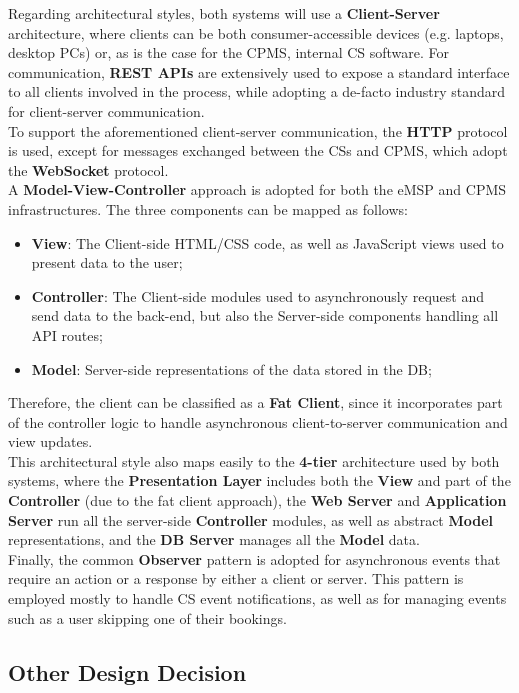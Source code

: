 \documentclass[11pt]{article}
\begin{document}
Regarding architectural styles, both systems will use a \textbf{Client-Server} architecture, where clients can be both consumer-accessible devices (e.g. laptops, desktop PCs) or, as is the case for the CPMS, internal CS software. For communication, \textbf{REST APIs} are extensively used to expose a standard interface to all clients involved in the process, while adopting a de-facto industry standard for client-server communication. \\
To support the aforementioned client-server communication, the \textbf{HTTP} protocol is used, except for messages exchanged between the CSs and CPMS, which adopt the \textbf{WebSocket} protocol. \\
A \textbf{Model-View-Controller} approach is adopted for both the eMSP and CPMS infrastructures. The three components can be mapped as follows:
\begin{itemize}
    \item \textbf{View}: The Client-side HTML/CSS code, as well as JavaScript views used to present data to the user;
    \item \textbf{Controller}: The Client-side modules used to asynchronously request and send data to the back-end, but also the Server-side components handling all API routes;
    \item \textbf{Model}: Server-side representations of the data stored in the DB;
\end{itemize}
Therefore, the client can be classified as a \textbf{Fat Client}, since it incorporates part of the controller logic to handle asynchronous client-to-server communication and view updates. \\
This architectural style also maps easily to the \textbf{4-tier} architecture used by both systems, where the \textbf{Presentation Layer} includes both the \textbf{View} and part of the \textbf{Controller} (due to the fat client approach), the \textbf{Web Server} and \textbf{Application Server} run all the server-side \textbf{Controller} modules, as well as abstract \textbf{Model} representations, and the \textbf{DB Server} manages all the \textbf{Model} data. \\
Finally, the common \textbf{Observer} pattern is adopted for asynchronous events that require an action or a response by either a client or server. This pattern is employed mostly to handle CS event notifications, as well as for managing events such as a user skipping one of their bookings. \\

\subsection{Other Design Decision}
\end{document}
